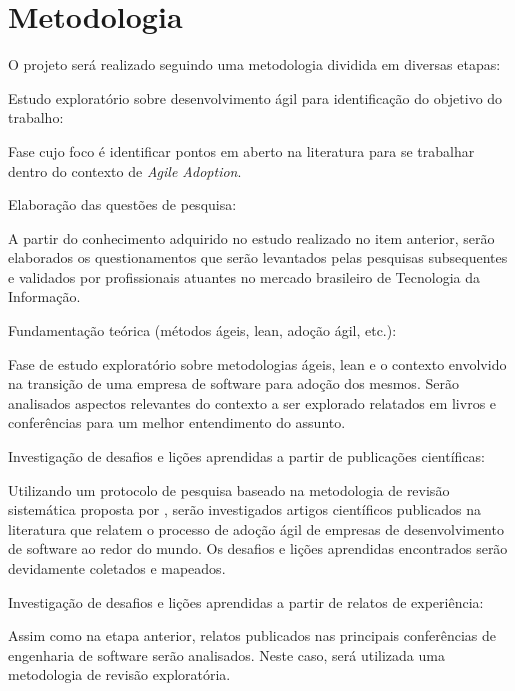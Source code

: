 \documentclass[a4paper,11pt]{article}
\newcounter{contadorDeEtapas}
\begin{document}
\section{Metodologia}
O projeto será realizado seguindo uma metodologia dividida em diversas etapas:
\begin{list}{\bfseries{}E -~}{\bfseries}
		\item Estudo exploratório sobre desenvolvimento ágil para identificação do objetivo do trabalho:

			\textnormal{Fase cujo foco é identificar pontos em aberto na literatura para se trabalhar dentro do contexto de \textit{Agile Adoption}.}

		\item Elaboração das questões de pesquisa:

			\textnormal{A partir do conhecimento adquirido no estudo realizado no item anterior, serão elaborados os questionamentos que serão levantados pelas pesquisas subsequentes e validados por profissionais atuantes no mercado brasileiro de Tecnologia da Informação.}

		\item Fundamentação teórica (métodos ágeis, lean, adoção ágil, etc.):

			\textnormal{Fase de estudo exploratório sobre metodologias ágeis, lean e o contexto envolvido na transição de uma empresa de software para adoção dos mesmos. Serão analisados aspectos relevantes do contexto a ser explorado relatados em livros e conferências para um melhor entendimento do assunto.}

		\item Investigação de desafios e lições aprendidas  a partir de publicações científicas:

			\textnormal{Utilizando um protocolo de pesquisa baseado na metodologia de revisão sistemática proposta por \cite{Barbara2004}, serão investigados artigos científicos publicados na literatura que relatem o processo de adoção ágil de empresas de desenvolvimento de software ao redor do mundo. Os desafios e lições aprendidas encontrados serão devidamente coletados e mapeados.}

		\item Investigação de desafios e lições aprendidas  a partir de relatos de experiência:

			\textnormal{Assim como na etapa anterior, relatos publicados nas principais conferências de engenharia de software serão analisados. Neste caso, será utilizada uma metodologia de revisão exploratória.}


\end{list}
\end{document}
